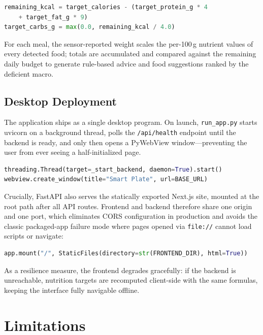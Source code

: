\documentclass[11pt,a4paper]{article}
\begin{document}
\begin{lstlisting}[language=Python]
remaining_kcal = target_calories - (target_protein_g * 4
    + target_fat_g * 9)
target_carbs_g = max(0.0, remaining_kcal / 4.0)
\end{lstlisting}

For each meal, the sensor-reported weight scales the per-100\,g nutrient values of every detected food; totals are accumulated and compared against the remaining daily budget to generate rule-based advice and food suggestions ranked by the deficient macro.

\subsection{Desktop Deployment}

The application ships as a single desktop program. On launch, \texttt{run\_app.py} starts uvicorn on a background thread, polls the \texttt{/api/health} endpoint until the backend is ready, and only then opens a PyWebView window---preventing the user from ever seeing a half-initialized page.

\begin{lstlisting}[language=Python]
threading.Thread(target=_start_backend, daemon=True).start()
webview.create_window(title="Smart Plate", url=BASE_URL)
\end{lstlisting}

Crucially, FastAPI also serves the statically exported Next.js site, mounted at the root path after all API routes. Frontend and backend therefore share one origin and one port, which eliminates CORS configuration in production and avoids the classic packaged-app failure mode where pages opened via \texttt{file://} cannot load scripts or navigate:

\begin{lstlisting}[language=Python]
app.mount("/", StaticFiles(directory=str(FRONTEND_DIR), html=True))
\end{lstlisting}

As a resilience measure, the frontend degrades gracefully: if the backend is unreachable, nutrition targets are recomputed client-side with the same formulas, keeping the interface fully navigable offline.

\section{Limitations}
\end{document}
